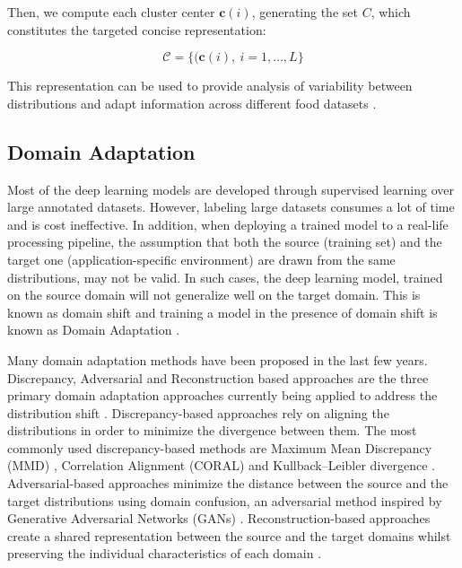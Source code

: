\documentclass[journal,article,accept,moreauthors,pdftex]{Definitions/mdpi}
\begin{document}
Then, we compute each cluster center $\textbf{c}(i)$, generating the set $C$, which constitutes the targeted concise representation:

\begin{equation}
\label{eq: cluster centroid set}
\mathcal{C} = \big\{(\textbf{c}(i), \ i=1,\ldots,L\big\} 
\end{equation}

This representation can be used to provide analysis of variability between distributions and adapt information across different food datasets \cite{ref40}.


 
\subsection{Domain Adaptation}

Most of the deep learning models are developed through supervised learning over large annotated datasets. However, labeling large datasets
consumes a lot of time and is  cost ineffective. In addition,
when deploying a trained model to a real-life processing pipeline, the
assumption that both the source (training set) and the
target one (application-specific environment) are drawn from the same
distributions, may not be valid. In such cases, the deep learning model,
trained on the source domain will not generalize well on the
target domain. This is known as domain shift and training a model in the presence of domain shift is known as Domain Adaptation \cite{ref51}.


Many domain adaptation methods have been proposed in the last few years. Discrepancy, Adversarial and
Reconstruction based approaches are the three primary domain
adaptation approaches currently being applied to address
the distribution shift \cite{ref18}. Discrepancy-based approaches rely
on aligning the distributions in order to minimize the divergence
between them. The most commonly used discrepancy-based
methods are Maximum Mean Discrepancy (MMD) \cite{ref19},
Correlation Alignment (CORAL) \cite{ref20} and Kullback–Leibler
divergence \cite{ref21}. Adversarial-based approaches minimize the
distance between the source and the target distributions using
domain confusion, an adversarial method \cite{ref22, ref23} inspired by Generative
Adversarial Networks (GANs) \cite{ref93}. Reconstruction-based approaches create
a shared representation between the source and the target
domains whilst preserving the individual characteristics of
each domain \cite{ref24, ref48}.
\end{document}

